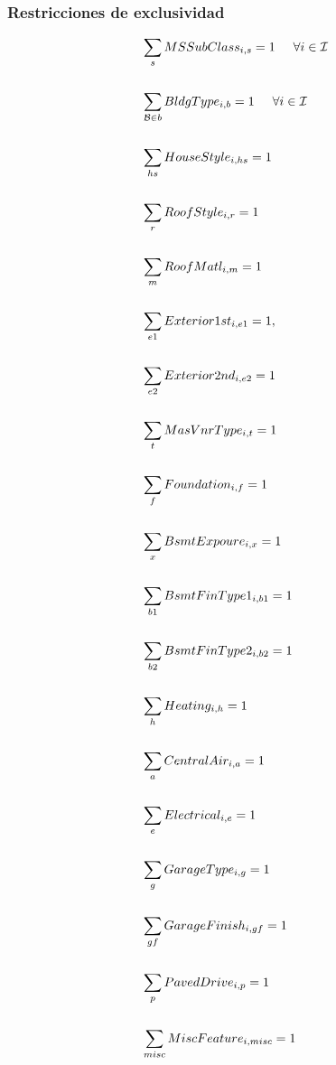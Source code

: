\documentclass{article}
\begin{document}
\subsubsection{Restricciones de exclusividad}
\begin{align}
    &\sum_{s} MSSubClass_{i,s}=1 \hspace{5mm} \forall i \in \mathcal{I} \\
    \\
    & \sum_{\mathcal{B}\in b} BldgType_{i,b}= 1 \hspace{5mm} \forall i \in \mathcal{I}\\
    \\
    & \sum _{hs} HouseStyle_{i,hs}=1\\
    \\
    &\sum_{r} RoofStyle_{i,r}=1\\
    \\
    &\sum_{m} RoofMatl_{i,m}=1\\
    \\
    &\sum_{e1} Exterior1st_{i,e1}=1,\\
    \\
    &\sum_{e2} Exterior2nd_{i,e2}=1\\
    \\
    &\sum_{t} MasVnrType_{i,t}=1\\
    \\
    &\sum_{f} Foundation_{i,f}=1\\
    \\
    &\sum_{x} BsmtExpoure_{i,x}=1\\
    \\
    &\sum_{b1} BsmtFinType1_{i,b1}=1\\
    \\
    &\sum_{b2} BsmtFinType2_{i,b2}=1\\
    \\
    &\sum_{h} Heating_{i,h}= 1\\
    \\
    &\sum_{a} CentralAir_{i,a}=1\\
    \\
    &\sum_{e} Electrical_{i,e}=1\\
    \\
    &\sum_{g} GarageType_{i,g}=1\\
    \\
    &\sum_{gf} GarageFinish_{i,gf}=1\\
    \\
    &\sum_{p} PavedDrive_{i,p}=1\\
    \\
    &\sum_{misc} MiscFeature_{i,misc}=1\\
    
    
\end{align}
\end{document}
